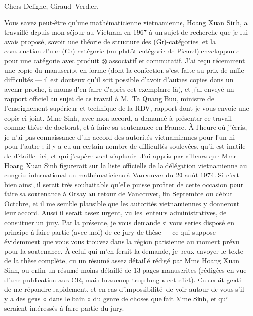 \documentclass[11pt,a4paper]{article}
\begin{document}
Chers Deligne, Giraud, Verdier,

Vous savez peut-être qu'une mathématicienne vietnamienne, Hoang Xuan Sinh,
a travaillé depuis mon séjour au Vietnam en 1967 à un sujet de recherche que
je lui avais proposé, savoir une théorie de structure des (Gr)-catégories,
et la construction d'une (Gr)-catégorie (ou plutôt catégorie de Picard)
enveloppante pour une catégorie avec produit $\otimes$ associatif et
commutatif. J'ai reçu récemment une copie du manuscript en forme (dont la
confection s'est faite au prix de mille difficultés --- il est douteux qu'il
soit possible d'avoir d'autres copies dans un avenir proche, à moins d'en
faire d'après cet exemplaire-là), et j'ai envoyé un rapport officiel au
sujet de ce travail à M.\ Ta Quang Buu, ministre de l'enseignement
supérieur et technique de la RDV, rapport dont je vous envoie une copie
ci-joint. Mme Sinh, avec mon accord, a demandé à présenter ce travail comme
thèse de doctorat, et à faire sa soutenance en France. À l'heure où
j'écris, je n'ai pas connaissance d'un accord des autorités vietnamiennes
pour l'un ni pour l'autre ; il y a eu un certain nombre de difficultés
soulevées, qu'il est inutile de détailler ici, et qui j'espère vont
s'aplanir. J'ai appris par ailleurs que Mme Hoang Xuan Sinh figurerait sur
la liste officielle de la délégation vietnamienne au congrès international
de mathématiciens à Vancouver du 20 août 1974. Si c'est bien ainsi, il
serait très souhaitable qu'elle puisse profiter de cette occasion pour
faire sa soutenance à Orsay au retour de Vancouver, fin Septembre ou début
Octobre, et il me semble plausible que les autorités vietnamiennes y
donneront leur accord. Aussi il serait assez urgent, vu les lenteurs
administratives, de constituer un jury. Par la présente, je vous demande si
vous seriez disposé en principe à faire partie (avec moi) de ce jury de
thèse --- ce qui suppose évidemment que vous vous trouvez dans la région
parisienne au moment prévu pour la soutenance. À celui qui m'en ferait la
demande, je peux envoyer le texte de la thèse complète, ou un résumé assez
détaillé rédigé par Mme Hoang Xuan Sinh, ou enfin un résumé moins détaillé
de 13 pages manuscrites (rédigées en vue d'une publication aux CR, mais
beaucoup trop long à cet effet). Ce serait gentil de me répondre rapidement,
et en cas d'impossibilité, de voir autour de vous s'il y a des gens « dans
le bain » du genre de choses que fait Mme Sinh, et qui seraient
intéressés à faire partie du jury.

\end{document}
